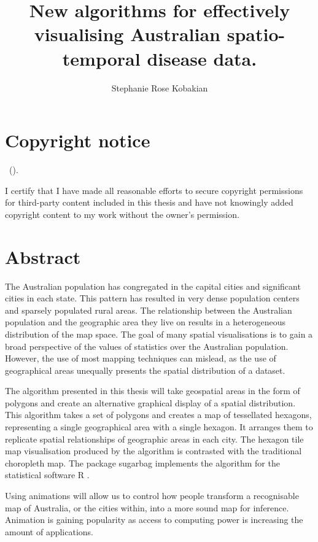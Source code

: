 \documentclass{monashthesis}
\author{Stephanie Rose Kobakian}
\title{New algorithms for effectively visualising Australian spatio-temporal disease data.}
\begin{document}

\titlepage

{\sf\tighttoc\doublespacing}

\hypertarget{copyright-notice}{%
\chapter*{Copyright notice}\label{copyright-notice}}

\textcopyright { } \authorname~(\number\the\year).

I certify that I have made all reasonable efforts to secure copyright permissions for third-party content included in this thesis and have not knowingly added copyright content to my work without the owner's permission.

\newpage

\hypertarget{abstract}{%
\chapter*{Abstract}\label{abstract}}

The Australian population has congregated in the capital cities and significant cities in each state. This pattern has resulted in very dense population centers and sparsely populated rural areas. The relationship between the Australian population and the geographic area they live on results in a heterogeneous distribution of the map space. The goal of many spatial visualisations is to gain a broad perspective of the values of statistics over the Australian population. However, the use of most mapping techniques can mislead, as the use of geographical areas unequally presents the spatial distribution of a dataset.

The algorithm presented in this thesis will take geospatial areas in the form of polygons and create an alternative graphical display of a spatial distribution. This algorithm takes a set of polygons and creates a map of tessellated hexagons, representing a single geographical area with a single hexagon. It arranges them to replicate spatial relationships of geographic areas in each city. The hexagon tile map visualisation produced by the algorithm is contrasted with the traditional choropleth map.
The package sugarbag \autocite{sugarbag} implements the algorithm for the statistical software R \autocite{R}.

Using animations will allow us to control how people transform a recognisable map of Australia, or the cities within, into a more sound map for inference. Animation is gaining popularity as access to computing power is increasing the amount of applications.
\end{document}
